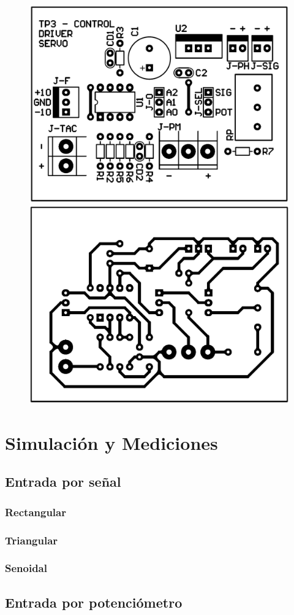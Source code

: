 \documentclass{article}
\begin{document}
\begin{figure}[H]
\centering
\includegraphics[width=0.4\linewidth]{../Images/Top.png}
\centering
\includegraphics[width=0.4\linewidth]{../Images/Bottom.png}
\end{figure}


\section{Simulación y Mediciones}



\subsection{Entrada por señal}

\subsubsection{Rectangular}

\subsubsection{Triangular}

\subsubsection{Senoidal}


\subsection{Entrada por potenciómetro}
\end{document}
